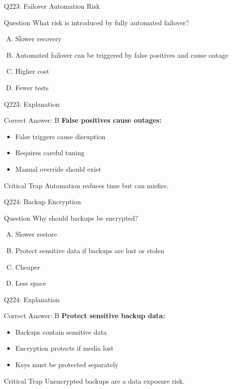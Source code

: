 \documentclass{beamer}
\begin{document}
	\begin{frame}{Q223: Failover Automation Risk}
		\begin{block}{Question}
			What risk is introduced by fully automated failover?
		\end{block}
		\begin{enumerate}[(A)]
			\item Slower recovery
			\item Automated failover can be triggered by false positives and cause outage
			\item Higher cost
			\item Fewer tests
		\end{enumerate}
	\end{frame}
	
	\begin{frame}{Q223: Explanation}
		\begin{block}{Correct Answer: B}
			\textbf{False positives cause outages:}
			\begin{itemize}
				\item False triggers cause disruption
				\item Requires careful tuning
				\item Manual override should exist
			\end{itemize}
		\end{block}
		\begin{alertblock}{Critical Trap}
			Automation reduces time but can misfire.
		\end{alertblock}
	\end{frame}
	
	\begin{frame}{Q224: Backup Encryption}
		\begin{block}{Question}
			Why should backups be encrypted?
		\end{block}
		\begin{enumerate}[(A)]
			\item Slower restore
			\item Protect sensitive data if backups are lost or stolen
			\item Cheaper
			\item Less space
		\end{enumerate}
	\end{frame}
	
	\begin{frame}{Q224: Explanation}
		\begin{block}{Correct Answer: B}
			\textbf{Protect sensitive backup data:}
			\begin{itemize}
				\item Backups contain sensitive data
				\item Encryption protects if media lost
				\item Keys must be protected separately
			\end{itemize}
		\end{block}
		\begin{alertblock}{Critical Trap}
			Unencrypted backups are a data exposure risk.
		\end{alertblock}
	\end{frame}
	
\end{document}
